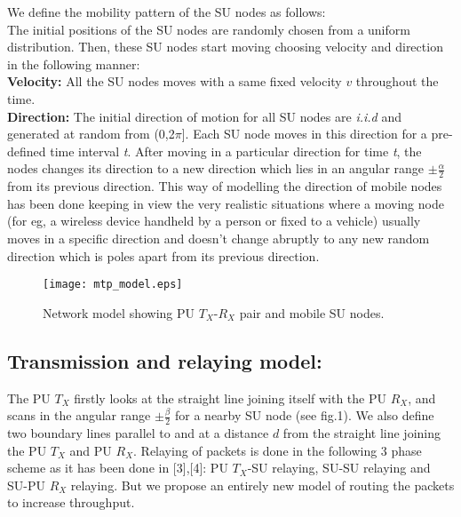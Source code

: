 \documentclass[conference]{IEEEtran}
\begin{document}
We define the mobility pattern of the SU nodes as follows:\\
The initial positions of the SU nodes are randomly chosen from a uniform distribution. Then, these SU nodes start moving choosing velocity and direction in the 
following manner:\\
{\bf Velocity:} All the SU nodes moves with a same fixed velocity $v$ throughout the time.\\
{\bf Direction:} The initial direction of motion for all SU nodes are \emph{i.i.d} and generated at random from (0,2$\pi$]. Each SU node moves in this 
direction for a pre-defined time interval \emph{t}. After moving in a particular direction for time \emph{t}, the nodes changes its direction to a new direction
 which lies in an angular range $\pm \frac{\alpha}{2}$ from its previous direction. This way of modelling the direction of mobile nodes has been done keeping in view the very 
realistic situations where a moving node (for eg, a wireless device handheld by a person or fixed to a vehicle) usually moves in a specific direction and doesn't 
change abruptly to any new random direction which is poles apart from its previous direction.

\begin{figure}[ht] \centering \label{con} \texttt{[image: mtp\_model.eps]}\\
\caption{Network model showing PU $T_X$-$R_X$ pair and mobile SU nodes.} 
\vspace{-2.25mm}
\end{figure}

\subsection{Transmission and relaying model:} The PU $T_X$ firstly looks at the straight line joining itself with the PU $R_X$, and scans in the angular range $\pm \frac{\beta}{2}$ for a nearby SU node (see fig.1). 
We also define two boundary lines parallel to and at a distance $d$ from the straight line joining the PU $T_X$ and PU $R_X$. Relaying of packets is done in the following 
3 phase scheme as it has been done in [3],[4]: PU $T_X$-SU relaying, SU-SU relaying and SU-PU $R_X$ relaying. But we propose an entirely new model of routing the packets to increase
throughput.
\end{document}
